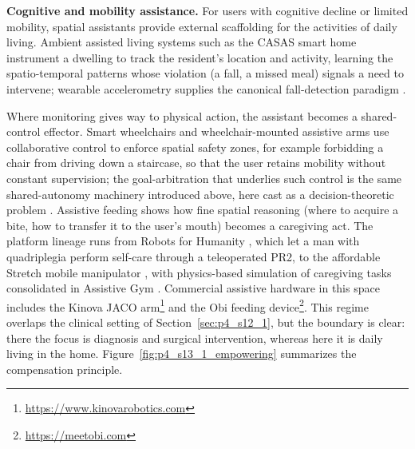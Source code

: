 \textbf{Cognitive and mobility assistance.} For users with cognitive decline or limited mobility, spatial assistants provide external scaffolding for the activities of daily living. 
Ambient assisted living systems such as the CASAS smart home \cite{cook2013casas} instrument a dwelling to track the resident's location and activity, learning the spatio-temporal patterns whose violation (a fall, a missed meal) signals a need to intervene; wearable accelerometry supplies the canonical fall-detection paradigm \cite{bourke2007evaluation}.

Where monitoring gives way to physical action, the assistant becomes a shared-control effector. 
Smart wheelchairs \cite{simpson2005smart} and wheelchair-mounted assistive arms use collaborative control to enforce spatial safety zones, for example forbidding a chair from driving down a staircase, so that the user retains mobility without constant supervision; the goal-arbitration that underlies such control is the same shared-autonomy machinery introduced above, here cast as a decision-theoretic problem \cite{ghorbel2018decision}. 
Assistive feeding \cite{bhattacharjee2019towards} shows how fine spatial reasoning (where to acquire a bite, how to transfer it to the user's mouth) becomes a caregiving act. 
The platform lineage runs from Robots for Humanity \cite{chen2013robots}, which let a man with quadriplegia perform self-care through a teleoperated PR2, to the affordable Stretch mobile manipulator \cite{kemp2022design}, with physics-based simulation of caregiving tasks consolidated in Assistive Gym \cite{erickson2020assistive}. 
Commercial assistive hardware in this space includes the Kinova JACO arm\footnote{\url{https://www.kinovarobotics.com}} and the Obi feeding device\footnote{\url{https://meetobi.com}}.
This regime overlaps the clinical setting of Section~\ref{sec:p4_s12_1}, but the boundary is clear: there the focus is diagnosis and surgical intervention, whereas here it is daily living in the home. Figure~\ref{fig:p4_s13_1_empowering} summarizes the compensation principle.



